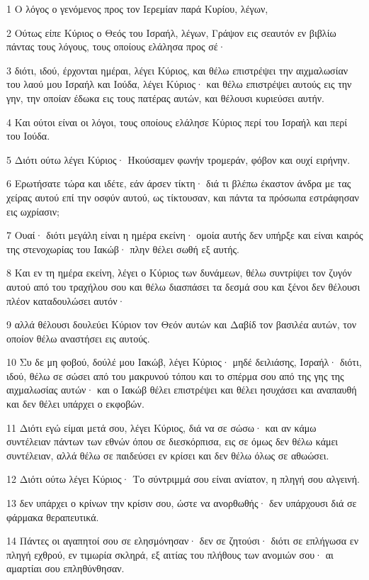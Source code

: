 \par 1 Ο λόγος ο γενόμενος προς τον Ιερεμίαν παρά Κυρίου, λέγων,
\par 2 Ούτως είπε Κύριος ο Θεός του Ισραήλ, λέγων, Γράψον εις σεαυτόν εν βιβλίω πάντας τους λόγους, τους οποίους ελάλησα προς σέ·
\par 3 διότι, ιδού, έρχονται ημέραι, λέγει Κύριος, και θέλω επιστρέψει την αιχμαλωσίαν του λαού μου Ισραήλ και Ιούδα, λέγει Κύριος· και θέλω επιστρέψει αυτούς εις την γην, την οποίαν έδωκα εις τους πατέρας αυτών, και θέλουσι κυριεύσει αυτήν.
\par 4 Και ούτοι είναι οι λόγοι, τους οποίους ελάλησε Κύριος περί του Ισραήλ και περί του Ιούδα.
\par 5 Διότι ούτω λέγει Κύριος· Ηκούσαμεν φωνήν τρομεράν, φόβον και ουχί ειρήνην.
\par 6 Ερωτήσατε τώρα και ιδέτε, εάν άρσεν τίκτη· διά τι βλέπω έκαστον άνδρα με τας χείρας αυτού επί την οσφύν αυτού, ως τίκτουσαν, και πάντα τα πρόσωπα εστράφησαν εις ωχρίασιν;
\par 7 Ουαί· διότι μεγάλη είναι η ημέρα εκείνη· ομοία αυτής δεν υπήρξε και είναι καιρός της στενοχωρίας του Ιακώβ· πλην θέλει σωθή εξ αυτής.
\par 8 Και εν τη ημέρα εκείνη, λέγει ο Κύριος των δυνάμεων, θέλω συντρίψει τον ζυγόν αυτού από του τραχήλου σου και θέλω διασπάσει τα δεσμά σου και ξένοι δεν θέλουσι πλέον καταδουλώσει αυτόν·
\par 9 αλλά θέλουσι δουλεύει Κύριον τον Θεόν αυτών και Δαβίδ τον βασιλέα αυτών, τον οποίον θέλω αναστήσει εις αυτούς.
\par 10 Συ δε μη φοβού, δούλέ μου Ιακώβ, λέγει Κύριος· μηδέ δειλιάσης, Ισραήλ· διότι, ιδού, θέλω σε σώσει από του μακρυνού τόπου και το σπέρμα σου από της γης της αιχμαλωσίας αυτών· και ο Ιακώβ θέλει επιστρέψει και θέλει ησυχάσει και αναπαυθή και δεν θέλει υπάρχει ο εκφοβών.
\par 11 Διότι εγώ είμαι μετά σου, λέγει Κύριος, διά να σε σώσω· και αν κάμω συντέλειαν πάντων των εθνών όπου σε διεσκόρπισα, εις σε όμως δεν θέλω κάμει συντέλειαν, αλλά θέλω σε παιδεύσει εν κρίσει και δεν θέλω όλως σε αθωώσει.
\par 12 Διότι ούτω λέγει Κύριος· Το σύντριμμά σου είναι ανίατον, η πληγή σου αλγεινή.
\par 13 δεν υπάρχει ο κρίνων την κρίσιν σου, ώστε να ανορθωθής· δεν υπάρχουσι διά σε φάρμακα θεραπευτικά.
\par 14 Πάντες οι αγαπητοί σου σε ελησμόνησαν· δεν σε ζητούσι· διότι σε επλήγωσα εν πληγή εχθρού, εν τιμωρία σκληρά, εξ αιτίας του πλήθους των ανομιών σου· αι αμαρτίαι σου επληθύνθησαν.
